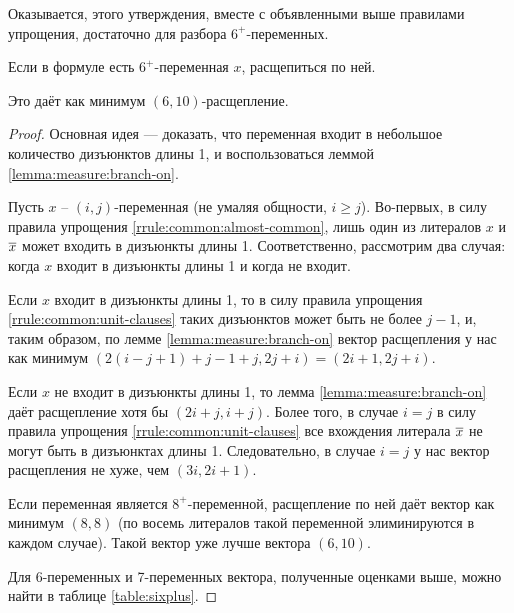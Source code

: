 Оказывается, этого утверждения, вместе с объявленными выше правилами упрощения, достаточно для разбора $6^+$-переменных.

\begin{brule}
 Если в формуле есть $6^+$-переменная $x$, расщепиться по ней.

 Это даёт как минимум $(6,10)$-расщепление.
 \label{brule:measure:sixplus}
\end{brule}

\begin{proof}
 Основная идея — доказать, что переменная входит в небольшое количество дизъюнктов длины 1, и воспользоваться леммой \ref{lemma:measure:branch-on}.

 Пусть $x$ -- $(i,j)$-переменная (не умаляя общности, $i \geq j$). Во-первых, в силу правила упрощения \ref{rrule:common:almost-common}, лишь один из литералов $x$ и $\overline{x}$ может входить в дизъюнкты длины 1. Соответственно, рассмотрим два случая: когда $x$ входит в дизъюнкты длины 1 и когда не входит.

 Если $x$ входит в дизъюнкты длины 1, то в силу правила упрощения \ref{rrule:common:unit-clauses} таких дизъюнктов может быть не более $j - 1$, и, таким образом, по лемме \ref{lemma:measure:branch-on} вектор расщепления у нас как минимум $(2(i - j + 1) + j - 1 + j, 2j + i) = (2i + 1, 2j + i)$.

 Если $x$ не входит в дизъюнкты длины 1, то лемма \ref{lemma:measure:branch-on} даёт расщепление хотя бы $(2i + j, i + j)$. Более того, в случае $i = j$ в силу правила упрощения \ref{rrule:common:unit-clauses} все вхождения литерала $\overline{x}$ не могут быть в дизъюнктах длины 1. Следовательно, в случае $i = j$ у нас вектор расщепления не хуже, чем $(3i, 2i + 1)$.

 Если переменная является $8^+$-переменной, расщепление по ней даёт вектор как минимум $(8,8)$ (по восемь литералов такой переменной элиминируются в каждом случае). Такой вектор уже лучше вектора $(6,10)$.

 Для 6-переменных и 7-переменных вектора, полученные оценками выше, можно найти в таблице \ref{table:sixplus}.


\end{proof}
